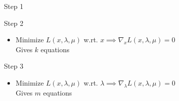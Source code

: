 \documentclass{beamer}
\begin{document}
\begin{frame}{Step 1}
	\begin{itemize}
	\end{itemize}
\end{frame}

\begin{frame}{Step 2}
	\begin{itemize}
		\item Minimize $L(x, \lambda, \mu)$ w.rt. $x \implies \nabla_xL(x, \lambda, \mu) = 0 $\\
		Gives $k$ equations
	\end{itemize}
\end{frame}

\begin{frame}{Step 3}
	\begin{itemize}
		\item Minimize $L(x, \lambda, \mu)$ w.rt. $\lambda \implies \nabla_\lambda L(x, \lambda, \mu) = 0 $\\
		Gives $m$ equations
	\end{itemize}
\end{frame}
\end{document}
